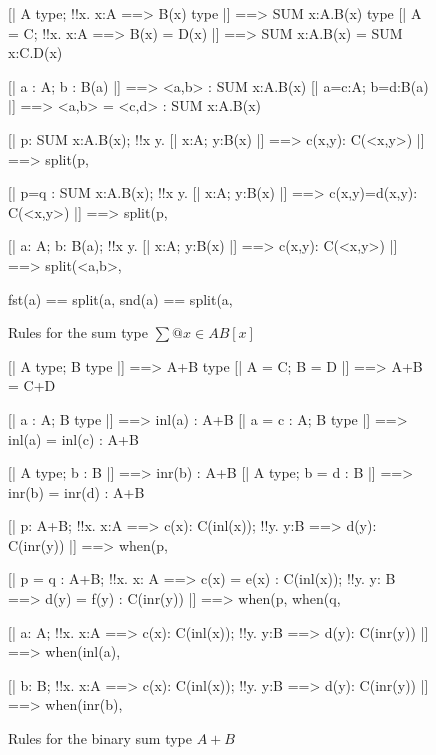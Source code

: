 \begin{figure} 
\begin{ttbox}
      [| A type;  !!x. x:A ==> B(x) type |] ==> SUM x:A.B(x) type
     [| A = C;  !!x. x:A ==> B(x) = D(x) 
          |] ==> SUM x:A.B(x) = SUM x:C.D(x)

      [| a : A;  b : B(a) |] ==> <a,b> : SUM x:A.B(x)
     [| a=c:A;  b=d:B(a) |] ==> <a,b> = <c,d> : SUM x:A.B(x)

      [| p: SUM x:A.B(x);  
             !!x y. [| x:A; y:B(x) |] ==> c(x,y): C(<x,y>) 
          |] ==> split(p, %

     [| p=q : SUM x:A.B(x); 
             !!x y. [| x:A; y:B(x) |] ==> c(x,y)=d(x,y): C(<x,y>)
          |] ==> split(p, %

      [| a: A;  b: B(a);
             !!x y. [| x:A; y:B(x) |] ==> c(x,y): C(<x,y>)
          |] ==> split(<a,b>, %

   fst(a) == split(a, %
   snd(a) == split(a, %
\end{ttbox}
\caption{Rules for the sum type $\sum@{x\in A}B[x]$} \label{ctt-sum}
\end{figure}


\begin{figure} 
\begin{ttbox}
       [| A type;  B type |] ==> A+B type
      [| A = C;  B = D |] ==> A+B = C+D

   [| a : A;  B type |] ==> inl(a) : A+B
  [| a = c : A;  B type |] ==> inl(a) = inl(c) : A+B

   [| A type;  b : B |] ==> inr(b) : A+B
  [| A type;  b = d : B |] ==> inr(b) = inr(d) : A+B

     [| p: A+B;
             !!x. x:A ==> c(x): C(inl(x));  
             !!y. y:B ==> d(y): C(inr(y))
          |] ==> when(p, %

    [| p = q : A+B;
             !!x. x: A ==> c(x) = e(x) : C(inl(x));   
             !!y. y: B ==> d(y) = f(y) : C(inr(y))
          |] ==> when(p, %
                 when(q, %

 [| a: A;
             !!x. x:A ==> c(x): C(inl(x));  
             !!y. y:B ==> d(y): C(inr(y))
          |] ==> when(inl(a), %

 [| b: B;
             !!x. x:A ==> c(x): C(inl(x));  
             !!y. y:B ==> d(y): C(inr(y))
          |] ==> when(inr(b), %
\end{ttbox}
\caption{Rules for the binary sum type $A+B$} \label{ctt-plus}
\end{figure}


